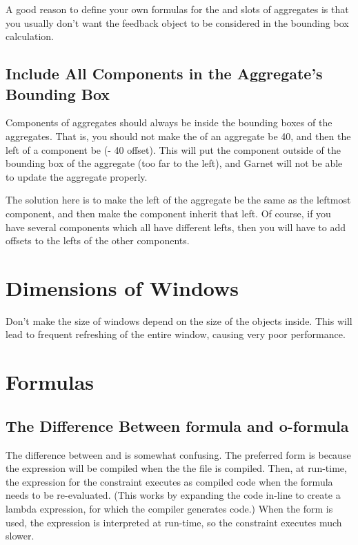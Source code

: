 A good reason to define your own formulas for the  and
 slots of aggregates is that you usually don't want the
feedback object to be considered in the bounding box calculation.


\subsection{Include All Components in the Aggregate's Bounding Box}

Components of aggregates should always be inside the bounding boxes
of the aggregates.  That is, you should not make the  of an
aggregate be 40, and then the left of a component be
(- 40 offset).  This will put the component outside of the bounding
box of the aggregate (too far to the left), and Garnet will not be
able to update the aggregate properly.

The solution here is to make the left of the aggregate be the same as
the leftmost component, and then make the component
inherit that left.  Of course, if you have several components which all
have different lefts, then you will have to add offsets to the lefts
of the other components.


\section{Dimensions of Windows}

Don't make the size of windows depend on the size of the objects
inside.  This will lead to frequent refreshing of the entire window,
causing very poor performance.


\section{Formulas}


\subsection{The Difference Between formula and o-formula}
\label{formula-difference}

The difference between  and  is somewhat
confusing.  The preferred form is 
because the expression will be compiled when the the file is compiled.
Then, at run-time, the expression for the constraint executes as
compiled code when the formula needs to be re-evaluated.  (This works
by expanding the code in-line to create a lambda expression, for which
the compiler generates code.)  When the 
form is used, the expression is interpreted at run-time, so the
constraint executes much slower.

